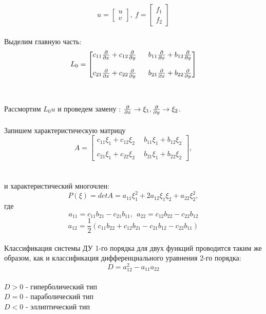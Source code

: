 \documentclass[../main.tex]{subfiles}
\begin{document}
$$u = \begin{bmatrix}
		u \\ v
	\end{bmatrix}, \  f = \begin{bmatrix}
		f_1 \\ f_2
	\end{bmatrix}$$ \\
Выделим главную часть: \\
$$
	L_0 = \begin{bmatrix}
		c_{11}\pderiv{}{x} + c_{12}\pderiv{}{y} \  & \ b_{11}\pderiv{}{x} + b_{12}\pderiv{}{y} \\ \\
		c_{21}\pderiv{}{x} + c_{22}\pderiv{}{y} \  & \ b_{21}\pderiv{}{x} + b_{22}\pderiv{}{y}
	\end{bmatrix}
$$ \\ \\
Рассмортим $L_0u$ и проведем замену : $\frac{\partial }{\partial x} \rightarrow \xi_1, \frac{\partial }{\partial y} \rightarrow \xi_2$. \\
\\ Запишем характеристическую матрицу
$$
	A = \begin{bmatrix}
		c_{11}\xi_1 + c_{12}\xi_2 \  & \ b_{11}\xi_1 + b_{12}\xi_2 \\ \\
		c_{21}\xi_1 + c_{22}\xi_2 \  & \ b_{21}\xi_1 + b_{22}\xi_2
	\end{bmatrix},
$$ \\ \\
и характеристический многочлен:\\
$$P(\xi) = detA = a_{11}\xi_1^2 + 2a_{12}\xi_1\xi_2+a_{22}\xi_2^2,$$
где
$$a_{11} = c_{11}b_{21} - c_{21}b_{11}, \ \
	a_{22} = c_{12}b_{22} - c_{22}b_{12}$$
$$a_{12} = \frac{1}{2}(c_{11}b_{22} + c_{12}b_{21} - c_{21}b_{12} - c_{22}b_{11})$$ \\
Классификация системы ДУ 1-го порядка для двух функций проводится таким же образом, как и классификация дифференциального уравнения 2-го порядка:
\\$$D = a_{12}^2 - a_{11}a_{22} $$ \\
$D > 0$ - гиперболический тип \\
$D = 0$ - параболический тип \\
$D < 0$ - эллиптический тип \\
\\
\\
\end{document}
